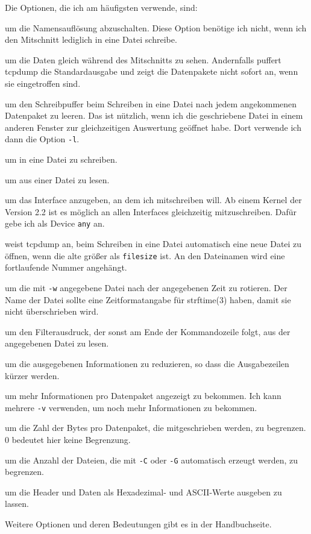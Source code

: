 \begin{normaltext}
  Die Optionen, die ich am häufigsten verwende, sind:
  \begin{description}
    \item[-n] um die Namensauflösung abzuschalten. Diese Option benötige ich
      nicht, wenn ich den Mitschnitt lediglich in eine Datei schreibe.
    \item[-l] um die Daten gleich während des Mitschnitts zu sehen.
      Andernfalls puffert tcpdump die Standardausgabe und zeigt die
      Datenpakete nicht sofort an, wenn sie eingetroffen sind.
    \item[-U] um den Schreibpuffer beim Schreiben in eine Datei nach jedem
      angekommenen Datenpaket zu leeren. Das ist nützlich, wenn ich die
      geschriebene Datei in einem anderen Fenster zur gleichzeitigen
      Auswertung geöffnet habe. Dort verwende ich dann die Option \verb?-l?.
    \item[-w filename] um in eine Datei zu schreiben.
    \item[-r filename] um aus einer Datei zu lesen.
    \item[-i device] um das Interface anzugeben, an dem ich mitschreiben will.
      Ab einem Kernel der Version 2.2 ist es möglich an allen Interfaces
      gleichzeitig mitzuschreiben. Dafür gebe ich als Device \verb?any? an.
    \item[-C filesize] weist tcpdump an, beim Schreiben in eine Datei
      automatisch eine neue Datei zu öffnen, wenn die alte größer als
      \verb?filesize? ist. An den Dateinamen wird eine fortlaufende Nummer
      angehängt.
    \item[-G seconds] um die mit \verb?-w? angegebene Datei nach der
      angegebenen Zeit zu rotieren. Der Name der Datei sollte eine
      Zeitformatangabe für strftime(3) haben, damit sie nicht überschrieben
      wird.
    \item[-F filename] um den Filterausdruck, der sonst am Ende der
      Kommandozeile folgt, aus der angegebenen Datei zu lesen.
    \item[-q] um die ausgegebenen Informationen zu reduzieren, so dass die
      Ausgabezeilen kürzer werden.
    \item[-v] um mehr Informationen pro Datenpaket angezeigt zu bekommen.
      Ich kann mehrere \verb?-v? verwenden, um noch mehr Informationen zu
      bekommen.
    \item[-s snaplen] um die Zahl der Bytes pro Datenpaket, die mitgeschrieben
      werden, zu begrenzen. 0 bedeutet hier keine Begrenzung.
    \item[-W filecount] um die Anzahl der Dateien, die mit \verb?-C? oder
      \verb?-G? automatisch erzeugt werden, zu begrenzen.
    \item[-x]
    \item[-X] um die Header und Daten als Hexadezimal- und ASCII-Werte
      ausgeben zu lassen.
    \item
  \end{description}

  Weitere Optionen und deren Bedeutungen gibt es in der Handbuchseite.
\end{normaltext}


